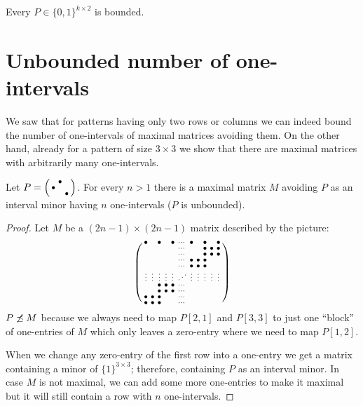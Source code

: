 \begin{cor}
Every $P\in\{0,1\}^{k\times 2}$ is bounded.
\end{cor}

\section{Unbounded number of one-intervals}
We saw that for patterns having only two rows or columns we can indeed bound the number of one-intervals of maximal matrices avoiding them. On the other hand, already for a pattern of size $3\times3$ we show that there are maximal matrices with arbitrarily many one-intervals.

\begin{thm}
\label{manyints}
Let $P=\left(\begin{smallmatrix} &\bullet& \\\bullet& & \\ & &\bullet\end{smallmatrix}\right)$. For every $n>1$ there is a maximal matrix $M$ avoiding $P$ as an interval minor having $n$ one-intervals ($P$ is unbounded).
\end{thm}
\begin{proof} Let $M$ be a $(2n-1)\times(2n-1)$ matrix described by the picture:
$$\left(\begin{smallmatrix}	\bullet& &\bullet& &\bullet&\cdots&\bullet& &\bullet& &\bullet\\
		 & & & & &\cdots& & &\bullet&\bullet&\bullet\\
		 & & & & &\cdots& & &\bullet&\bullet&\bullet\\
		 & & & & &\cdots&\bullet&\bullet&\bullet& & \\
		 & & & & &\cdots&\bullet&\bullet&\bullet& & \\
		\vdots&\vdots&\vdots&\vdots&\vdots&\iddots&\vdots&\vdots&\vdots&\vdots&\vdots\\
		 & &\bullet&\bullet&\bullet&\cdots& & & & & \\
		 & &\bullet&\bullet&\bullet&\cdots& & & & & \\
		\bullet&\bullet&\bullet& & &\cdots& & & & & \\
		\bullet&\bullet&\bullet& & &\cdots& & & & & \\
		 \end{smallmatrix}\right)$$
$P\not\preceq M$ because we always need to map $P[2,1]$ and $P[3,3]$ to just one ``block'' of one-entries of $M$ which only leaves a zero-entry where we need to map $P[1,2]$.

When we change any zero-entry of the first row into a one-entry we get a matrix containing a minor of $\{1\}^{3\times3}$; therefore, containing $P$ as an interval minor. In case $M$ is not maximal, we can add some more one-entries to make it maximal but it will still contain a row with $n$ one-intervals.
\end{proof}

